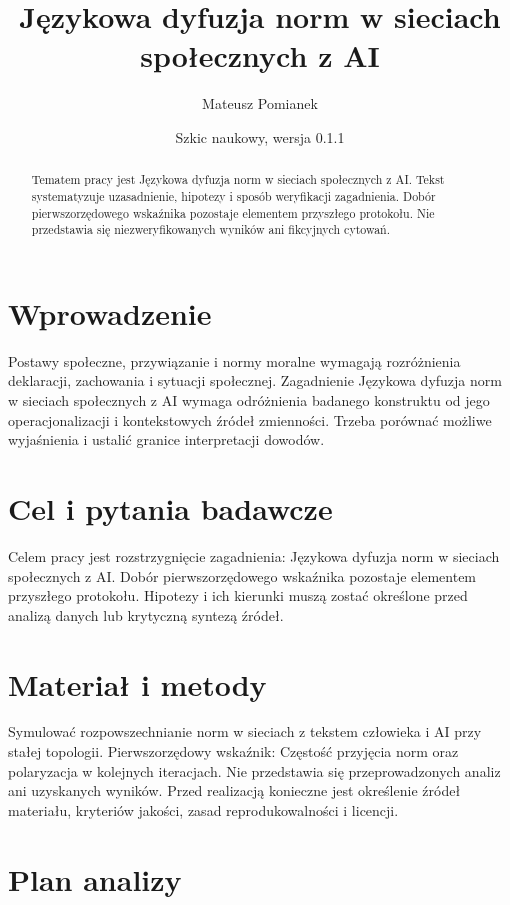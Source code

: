 \documentclass[11pt,a4paper]{article}
\title{Językowa dyfuzja norm w sieciach społecznych z AI}
\author{Mateusz Pomianek}
\date{Szkic naukowy, wersja 0.1.1}
\begin{document}
\maketitle

\begin{abstract}

Tematem pracy jest Językowa dyfuzja norm w sieciach społecznych z AI. Tekst systematyzuje uzasadnienie, hipotezy i sposób weryfikacji zagadnienia. Dobór pierwszorzędowego wskaźnika pozostaje elementem przyszłego protokołu. Nie przedstawia się niezweryfikowanych wyników ani fikcyjnych cytowań.

\end{abstract}

\section{Wprowadzenie}

Postawy społeczne, przywiązanie i normy moralne wymagają rozróżnienia deklaracji, zachowania i sytuacji społecznej. Zagadnienie Językowa dyfuzja norm w sieciach społecznych z AI wymaga odróżnienia badanego konstruktu od jego operacjonalizacji i kontekstowych źródeł zmienności. Trzeba porównać możliwe wyjaśnienia i ustalić granice interpretacji dowodów.

\section{Cel i pytania badawcze}

Celem pracy jest rozstrzygnięcie zagadnienia: Językowa dyfuzja norm w sieciach społecznych z AI. Dobór pierwszorzędowego wskaźnika pozostaje elementem przyszłego protokołu. Hipotezy i ich kierunki muszą zostać określone przed analizą danych lub krytyczną syntezą źródeł.

\section{Materiał i metody}

Symulować rozpowszechnianie norm w sieciach z tekstem człowieka i AI przy stałej topologii. Pierwszorzędowy wskaźnik: Częstość przyjęcia norm oraz polaryzacja w kolejnych iteracjach. Nie przedstawia się przeprowadzonych analiz ani uzyskanych wyników. Przed realizacją konieczne jest określenie źródeł materiału, kryteriów jakości, zasad reprodukowalności i licencji.

\section{Plan analizy}
\end{document}
